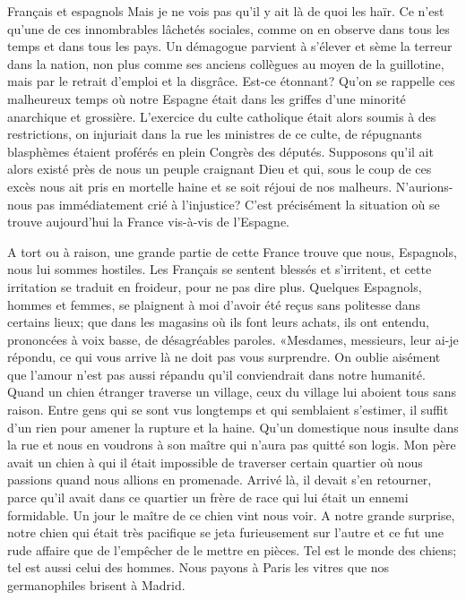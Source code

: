\begin{chapter}{Français et espagnols}
Mais je ne vois pas qu'il y ait là de quoi les haïr. Ce n'est qu'une de
ces innombrables lâchetés sociales, comme on en observe dans tous les
temps et dans tous les pays. Un démagogue parvient à s'élever et sème la
terreur dans la nation, non plus comme ses anciens collègues au moyen de
la guillotine, mais par le retrait d'emploi et la disgrâce. Est-ce
étonnant? Qu'on se rappelle ces malheureux temps où notre Espagne était
dans les griffes d'une minorité anarchique et grossière. L'exercice du
culte catholique était alors soumis à des restrictions, on injuriait
dans la rue les ministres de ce culte, de répugnants blasphèmes étaient
proférés en plein Congrès des députés. Supposons qu'il ait alors existé
près de nous un peuple craignant Dieu et qui, sous le coup de ces excès
nous ait pris en mortelle haine et se soit réjoui de nos malheurs.
N'aurions-nous pas immédiatement crié à l'injustice? C'est précisément
la situation où se trouve aujourd'hui la France vis-à-vis de l'Espagne.

A tort ou à raison, une grande partie de cette France trouve que nous,
Espagnols, nous lui sommes hostiles. Les Français se sentent blessés et
s'irritent, et cette irritation se traduit en froideur, pour ne pas dire
plus. Quelques Espagnols, hommes et femmes, se plaignent à moi d'avoir
été reçus sans politesse dans certains lieux; que dans les magasins où
ils font leurs achats, ils ont entendu, prononcées à voix basse, de
désagréables paroles. «Mesdames, messieurs, leur ai-je répondu, ce qui
vous arrive là ne doit pas vous surprendre. On oublie aisément que
l'amour n'est pas aussi répandu qu'il conviendrait dans notre humanité.
Quand un chien étranger traverse un village, ceux du village lui aboient
tous sans raison. Entre gens qui se sont vus longtemps et qui semblaient
s'estimer, il suffit d'un rien pour amener la rupture et la haine. Qu'un
domestique nous insulte dans la rue et nous en voudrons à son maître qui
n'aura pas quitté son logis. Mon père avait un chien à qui il était
impossible de traverser certain quartier où nous passions quand nous
allions en promenade. Arrivé là, il devait s'en retourner, parce qu'il
avait dans ce quartier un frère de race qui lui était un ennemi
formidable. Un jour le maître de ce chien vint nous voir. A notre grande
surprise, notre chien qui était très pacifique se jeta furieusement sur
l'autre et ce fut une rude affaire que de l'empêcher de le mettre en
pièces. Tel est le monde des chiens; tel est aussi celui des hommes.
Nous payons à Paris les vitres que nos germanophiles brisent à Madrid.


\end{chapter}
